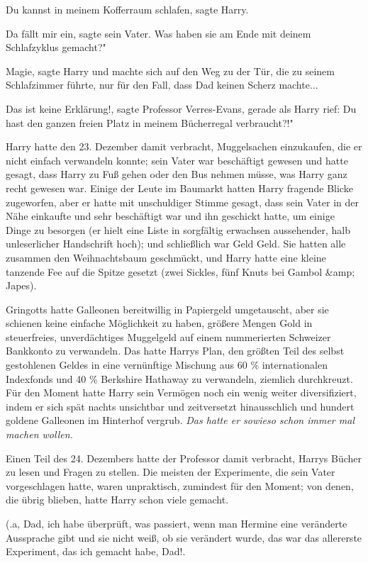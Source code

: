 \glqq Du kannst in meinem Kofferraum schlafen\grqq{}, sagte Harry.

\glqq Da fällt mir ein\grqq{}, sagte sein Vater. \glqq Was haben sie am Ende mit
deinem Schlafzyklus gemacht?"

\glqq Magie\grqq{}, sagte Harry und machte sich auf den Weg zu der Tür, die zu
seinem Schlafzimmer führte, nur für den Fall, dass Dad keinen Scherz machte...

\glqq Das ist keine Erklärung!\grqq{}, sagte Professor Verres-Evans, gerade als
Harry rief: \glqq Du hast den ganzen freien Platz in meinem Bücherregal
verbraucht?!"


Harry hatte den 23. Dezember damit verbracht, Muggelsachen einzukaufen, die er
nicht einfach verwandeln konnte; sein Vater war beschäftigt gewesen und hatte
gesagt, dass Harry zu Fuß gehen oder den Bus nehmen müsse, was Harry ganz recht
gewesen war. Einige der Leute im Baumarkt hatten Harry fragende Blicke
zugeworfen, aber er hatte mit unschuldiger Stimme gesagt, dass sein Vater in der
Nähe einkaufte und sehr beschäftigt war und ihn geschickt hatte, um einige Dinge
zu besorgen (er hielt eine Liste in sorgfältig erwachsen aussehender, halb
unleserlicher Handschrift hoch); und schließlich war Geld Geld. Sie hatten alle
zusammen den Weihnachtsbaum geschmückt, und Harry hatte eine kleine tanzende Fee
auf die Spitze gesetzt (zwei Sickles, fünf Knuts bei Gambol &amp; Japes).

Gringotts hatte Galleonen bereitwillig in Papiergeld umgetauscht, aber sie
schienen keine einfache Möglichkeit zu haben, größere Mengen Gold in
steuerfreies, unverdächtiges Muggelgeld auf einem nummerierten Schweizer
Bankkonto zu verwandeln. Das hatte Harrys Plan, den größten Teil des selbst
gestohlenen Geldes in eine vernünftige Mischung aus 60 \% internationalen
Indexfonds und 40 \% Berkshire Hathaway zu verwandeln, ziemlich durchkreuzt. Für
den Moment hatte Harry sein Vermögen noch ein wenig weiter diversifiziert, indem
er sich spät nachts unsichtbar und zeitversetzt hinausschlich und hundert
goldene Galleonen im Hinterhof vergrub.
\emph{ Das hatte er sowieso schon immer mal machen wollen. }

Einen Teil des 24. Dezembers hatte der Professor damit verbracht, Harrys Bücher
zu lesen und Fragen zu stellen. Die meisten der Experimente, die sein Vater
vorgeschlagen hatte, waren unpraktisch, zumindest für den Moment; von denen, die
übrig blieben, hatte Harry schon viele gemacht.

(\grqq{}.a, Dad, ich habe überprüft, was passiert, wenn man Hermine eine
veränderte Aussprache gibt und sie nicht weiß, ob sie verändert wurde, das war
das allererste Experiment, das ich gemacht habe, Dad!\grqq{}.

